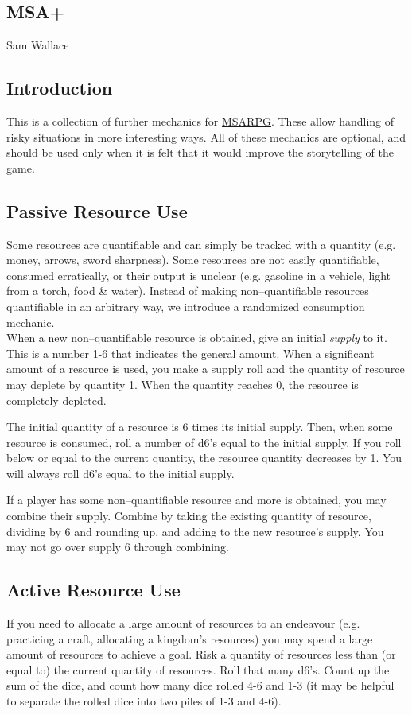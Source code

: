 \documentclass[landscape]{book}
\begin{document}
\begin{multicols*}{4}
  \chapter{MSA+}

  Sam Wallace

  \section*{Introduction}
  This is a collection of further mechanics for \href{https://quajzen.itch.io/msarpg}{MSARPG}. These allow handling of risky situations in more interesting ways. All of these mechanics are optional, and should be used only when it is felt that it would improve the storytelling of the game.

  \section*{Passive Resource Use}
  Some resources are quantifiable and can simply be tracked with a quantity (e.g. money, arrows, sword sharpness). Some resources are not easily quantifiable, consumed erratically, or their output is unclear (e.g. gasoline in a vehicle, light from a torch, food \& water). Instead of making non--quantifiable resources quantifiable in an arbitrary way, we introduce a randomized consumption mechanic. \\

  When a new non--quantifiable resource is obtained, give an initial \emph{supply} to it. This is a number 1-6 that indicates the general amount. When a significant amount of a resource is used, you make a supply roll and the quantity of resource may deplete by quantity 1. When the quantity reaches 0, the resource is completely depleted.

  The initial quantity of a resource is 6 times its initial supply. Then, when some resource is consumed, roll a number of d6's equal to the initial supply. If you roll below or equal to the current quantity, the resource quantity decreases by 1. You will always roll d6's equal to the initial supply.

  If a player has some non--quantifiable resource and more is obtained, you may combine their supply. Combine by taking the existing quantity of resource, dividing by 6 and rounding up, and adding to the new resource's supply. You may not go over supply 6 through combining.

  \section*{Active Resource Use}
  If you need to allocate a large amount of resources to an endeavour (e.g. practicing a craft, allocating a kingdom's resources) you may spend a large amount of resources to achieve a goal. Risk a quantity of resources less than (or equal to) the current quantity of resources. Roll that many d6's. Count up the sum of the dice, and count how many dice rolled 4-6 and 1-3 (it may be helpful to separate the rolled dice into two piles of 1-3 and 4-6).


\end{multicols*}
\end{document}
